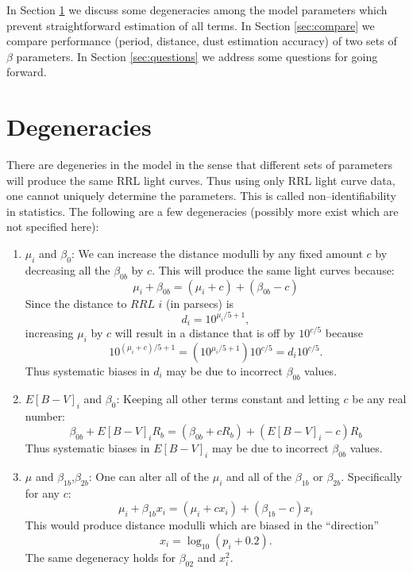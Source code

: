 \documentclass[12pt]{article}
\begin{document}
In Section \ref{sec:nonident} we discuss some degeneracies among the model parameters which prevent straightforward estimation of all terms. In Section \ref{sec:compare} we compare performance (period, distance, dust estimation accuracy) of two sets of $\beta$ parameters. In Section \ref{sec:questions} we address some questions for going forward.

\section{Degeneracies}
\label{sec:nonident}

There are degeneries in the model in the sense that different sets of parameters will produce the same RRL light curves. Thus using only RRL light curve data, one cannot uniquely determine the parameters. This is called non--identifiability in statistics. The following are a few degeneracies (possibly more exist which are not specified here):
\begin{enumerate}
\item $\mu_i$ and $\beta_{0}$: We can increase the distance modulli by any fixed amount $c$ by decreasing all the $\beta_{0b}$ by $c$. This will produce the same light curves because:
  \begin{equation*}
    \mu_i + \beta_{0b} = (\mu_i + c) + (\beta_{0b}-c)
  \end{equation*}
  Since the distance to $RRL$ $i$ (in parsecs) is
  \begin{equation*}
    d_i = 10^{\mu_i/5 + 1},
  \end{equation*}
  increasing $\mu_i$ by $c$ will result in a distance that is off by $10^{c/5}$ because
  \begin{equation*}
   10^{(\mu_i + c)/5 + 1} = (10^{\mu_i/5 + 1})10^{c/5} = d_i10^{c/5}.
  \end{equation*}
  Thus systematic biases in $d_i$ may be due to incorrect $\beta_{0b}$ values.
\item $E[B-V]_i$ and $\beta_{0}$: Keeping all other terms constant and letting $c$ be any real number:
  \begin{equation*}
    \beta_{0b} + E[B-V]_iR_b = (\beta_{0b} + cR_b) + (E[B-V]_i-c)R_b
  \end{equation*}
  Thus systematic biases in $E[B-V]_i$ may be due to incorrect $\beta_{0b}$ values.
\item $\mu$ and $\beta_{1b}$,$\beta_{2b}$: One can alter all of the $\mu_i$ and all of the $\beta_{1b}$ or $\beta_{2b}$. Specifically for any $c$:
  \begin{equation*}
    \mu_i + \beta_{1b}x_i = (\mu_i + cx_i) + (\beta_{1b}-c)x_i
  \end{equation*}
  This would produce distance modulli which are biased in the ``direction''
  \begin{equation*}
    x_i=\log_{10}(p_i+0.2).
  \end{equation*}
  The same degeneracy holds for $\beta_{02}$ and $x_i^2$.
\end{enumerate}
\end{document}
